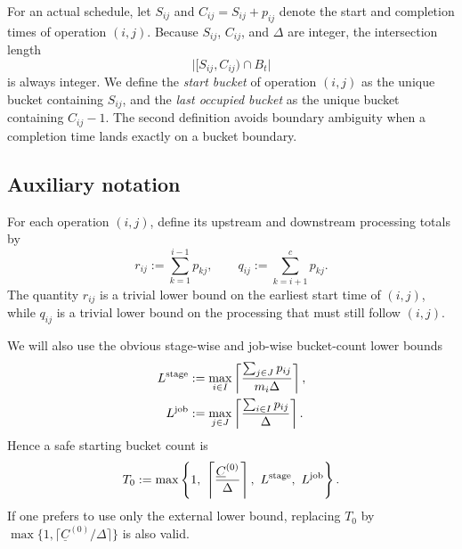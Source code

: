 \documentclass[11pt]{article}
\begin{document}
For an actual schedule, let $S_{ij}$ and $C_{ij}=S_{ij}+p_{ij}$ denote the start and completion times of operation $(i,j)$.
Because $S_{ij}$, $C_{ij}$, and $\Delta$ are integer, the intersection length
\[
\bigl|[S_{ij},C_{ij})\cap B_t\bigr|
\]
is always integer.
We define the \emph{start bucket} of operation $(i,j)$ as the unique bucket containing $S_{ij}$, and the \emph{last occupied bucket} as the unique bucket containing $C_{ij}-1$.
The second definition avoids boundary ambiguity when a completion time lands exactly on a bucket boundary.

\subsection{Auxiliary notation}

For each operation $(i,j)$, define its upstream and downstream processing totals by
\[
r_{ij}:=\sum_{k=1}^{i-1} p_{kj},
\qquad
q_{ij}:=\sum_{k=i+1}^{c} p_{kj}.
\]
The quantity $r_{ij}$ is a trivial lower bound on the earliest start time of $(i,j)$, while $q_{ij}$ is a trivial lower bound on the processing that must still follow $(i,j)$.

We will also use the obvious stage-wise and job-wise bucket-count lower bounds
\begin{align}
L^{\textnormal{stage}} &:= \max_{i\in I}\left\lceil \frac{\sum_{j\in J} p_{ij}}{m_i\Delta}\right\rceil,
\label{eq:L-stage}\\
L^{\textnormal{job}} &:= \max_{j\in J}\left\lceil \frac{\sum_{i\in I} p_{ij}}{\Delta}\right\rceil.
\label{eq:L-job}
\end{align}
Hence a safe starting bucket count is
\[
T_0:=\max\left\{1,\ \left\lceil\frac{\underline C^{(0)}}{\Delta}\right\rceil,\ L^{\textnormal{stage}},\ L^{\textnormal{job}}\right\}.
\]
If one prefers to use only the external lower bound, replacing $T_0$ by $\max\{1,\lceil\underline C^{(0)}/\Delta\rceil\}$ is also valid.
\end{document}
